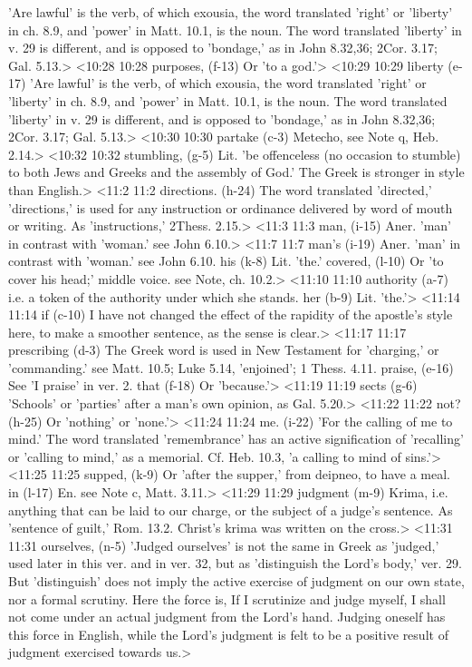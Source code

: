   'Are lawful' is the verb, of which exousia, the word  translated 'right' or 'liberty' in ch. 8.9, and 'power' in  Matt. 10.1, is the noun. The word translated 'liberty' in v. 29  is different, and is opposed to 'bondage,' as in John 8.32,36; 2Cor. 3.17; Gal. 5.13.>
<10:28 10:28  purposes, (f-13)  Or 'to a god.'>
<10:29 10:29  liberty (e-17)  'Are lawful' is the verb, of which exousia, the word  translated 'right' or 'liberty' in ch. 8.9, and 'power' in  Matt. 10.1, is the noun. The word translated 'liberty' in v. 29  is different, and is opposed to 'bondage,' as in John 8.32,36; 2Cor. 3.17; Gal. 5.13.>
<10:30 10:30  partake (c-3)  Metecho, see Note q, Heb. 2.14.>
<10:32 10:32  stumbling, (g-5)  Lit. 'be offenceless (no occasion to stumble) to both Jews  and Greeks and the assembly of God.' The Greek is stronger in  style than English.>
<11:2 11:2  directions. (h-24)  The word translated 'directed,' 'directions,' is used for any  instruction or ordinance delivered by word of mouth or writing.  As 'instructions,' 2Thess. 2.15.>
<11:3 11:3  man, (i-15)  Aner. 'man' in contrast with 'woman.' see John 6.10.>
<11:7 11:7  man's (i-19)  Aner. 'man' in contrast with 'woman.' see John 6.10.
  his (k-8)  Lit. 'the.'
  covered, (l-10)  Or 'to cover his head;' middle voice. see Note, ch. 10.2.>
<11:10 11:10  authority (a-7)  i.e. a token of the authority under which she stands.
  her (b-9)  Lit. 'the.'>
<11:14 11:14  if (c-10)  I have not changed the effect of the rapidity of the  apostle's style here, to make a smoother sentence, as the sense  is clear.>
<11:17 11:17  prescribing (d-3)  The Greek word is used in New Testament for 'charging,' or  'commanding.' see Matt. 10.5; Luke 5.14, 'enjoined'; 1 Thess. 4.11.
  praise, (e-16)  See 'I praise' in ver. 2.
  that (f-18)  Or 'because.'>
<11:19 11:19  sects (g-6)  'Schools' or 'parties' after a man's own opinion, as Gal. 5.20.>
<11:22 11:22  not? (h-25)  Or 'nothing' or 'none.'>
<11:24 11:24  me. (i-22)  'For the calling of me to mind.' The word translated  'remembrance' has an active signification of 'recalling' or  'calling to mind,' as a memorial. Cf. Heb. 10.3, 'a calling to  mind of sins.'>
<11:25 11:25  supped, (k-9)  Or 'after the supper,' from deipneo, to have a meal.
  in (l-17)  En. see Note c, Matt. 3.11.>
<11:29 11:29  judgment (m-9)  Krima, i.e. anything that can be laid to our charge, or the  subject of a judge's sentence. As 'sentence of guilt,' Rom. 13.2. Christ's krima was written on the cross.>
<11:31 11:31  ourselves, (n-5)  'Judged ourselves' is not the same in Greek as 'judged,'  used later in this ver. and in ver. 32, but as 'distinguish  the Lord's body,' ver. 29. But 'distinguish' does not imply the  active exercise of judgment on our own state, nor a formal  scrutiny. Here the force is, If I scrutinize and judge myself,  I shall not come under an actual judgment from the Lord's hand.  Judging oneself has this force in English, while the Lord's  judgment is felt to be a positive result of judgment exercised  towards us.>
